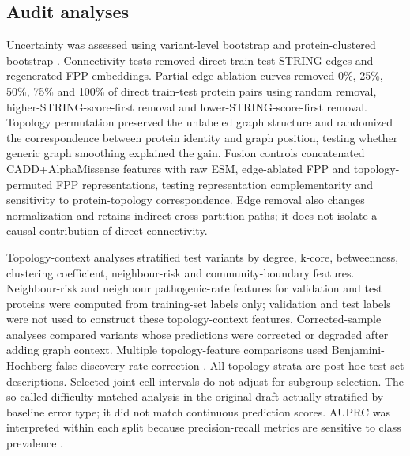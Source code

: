 \documentclass[conference]{IEEEtran}
\newcommand{\CADDAM}{CADD\allowbreak{}+\allowbreak{}AlphaMissense}
\begin{document}
\subsection{Audit analyses}

Uncertainty was assessed using variant-level bootstrap and protein-clustered bootstrap \cite{Efron1993Bootstrap}. Connectivity tests removed direct train-test STRING edges and regenerated FPP embeddings. Partial edge-ablation curves removed 0\%, 25\%, 50\%, 75\% and 100\% of direct train-test protein pairs using random removal, higher-STRING-score-first removal and lower-STRING-score-first removal. Topology permutation preserved the unlabeled graph structure and randomized the correspondence between protein identity and graph position, testing whether generic graph smoothing explained the gain. Fusion controls concatenated \CADDAM{} features with raw ESM, edge-ablated FPP and topology-permuted FPP representations, testing representation complementarity and sensitivity to protein-topology correspondence. Edge removal also changes normalization and retains indirect cross-partition paths; it does not isolate a causal contribution of direct connectivity.

Topology-context analyses stratified test variants by degree, k-core, betweenness, clustering coefficient, neighbour-risk and community-boundary features. Neighbour-risk and neighbour pathogenic-rate features for validation and test proteins were computed from training-set labels only; validation and test labels were not used to construct these topology-context features. Corrected-sample analyses compared variants whose predictions were corrected or degraded after adding graph context. Multiple topology-feature comparisons used Benjamini-Hochberg false-discovery-rate correction \cite{Benjamini1995FDR}. All topology strata are post-hoc test-set descriptions. Selected joint-cell intervals do not adjust for subgroup selection. The so-called difficulty-matched analysis in the original draft actually stratified by baseline error type; it did not match continuous prediction scores. AUPRC was interpreted within each split because precision-recall metrics are sensitive to class prevalence \cite{Saito2015PrecisionRecall}.
\end{document}
